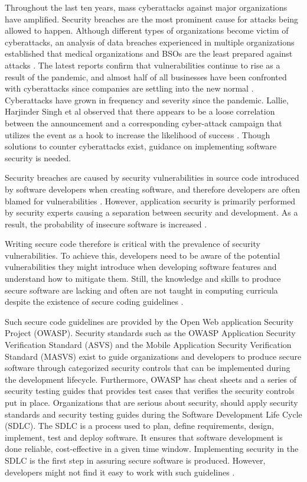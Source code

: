 Throughout the last ten years, mass cyberattacks against major organizations have amplified. Security breaches are the most prominent cause for attacks being allowed to happen. Although different types of organizations become victim of cyberattacks, an analysis of data breaches experienced in multiple organizations established that medical organizations and BSOs are the least prepared against attacks \cite{Hammouchi_2019}. The latest reports confirm that vulnerabilities continue to rise as a result of the pandemic, and almost half of all businesses have been confronted with cyberattacks since companies are settling into the new normal \cite{Weir_2021}. Cyberattacks have grown in frequency and severity since the pandemic. Lallie, Harjinder Singh et al observed that there appears to be a loose correlation between the announcement and a corresponding cyber-attack campaign that utilizes the event as a hook to increase the likelihood of success \cite{Lallie_2021}. Though solutions to counter cyberattacks exist, guidance on implementing software security is needed.

Security breaches are caused by security vulnerabilities in source code introduced by software developers when creating software, and therefore developers are often blamed for vulnerabilities \cite{Assal_2019}. However, application security is primarily performed by security experts causing a separation between security and development. As a result, the probability of insecure software is increased \cite{Thomas_2018}.

Writing secure code therefore is critical with the prevalence of security vulnerabilities. To achieve this, developers need to be aware of the potential vulnerabilities they might introduce when developing software features and understand how to mitigate them. Still, the knowledge and skills to produce secure software are lacking and often are not taught in computing curricula despite the existence of secure coding guidelines \cite{Tabassum_2018} \cite{yu2011teaching} \cite{Espinha_Gasiba_2021} \cite{blindspot_2018}.

Such secure code guidelines are provided by the Open Web application Security Project (OWASP). Security standards such as the OWASP Application Security Verification Standard (ASVS) and the Mobile Application Security Verification Standard (MASVS) exist to guide organizations and developers to produce secure software through categorized security controls that can be implemented during the development lifecycle. Furthermore, OWASP has cheat sheets and a series of security testing guides that provides test cases that verifies the security controls put in place. Organizations that are serious about security, should apply security standards and security testing guides during the Software Development Life Cycle (SDLC). The SDLC is a process used to plan, define requirements, design, implement, test and deploy software. It ensures that software development is done reliable, cost-effective in a given time window. Implementing security in the SDLC is the first step in assuring secure software is produced. However, developers might not find it easy to work with such guidelines \cite{Acar_2017}.

